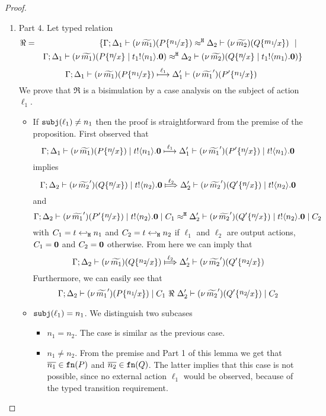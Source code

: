 \begin{proof}
\begin{enumerate}
		\item	Part 4. Let typed relation
				\begin{eqnarray*}
					\Re &=& \set{	\horel{\Gamma}{\Delta_1}{ \newsp{\widetilde{m_1}}{P \subst{n_1}{x} }}
									{\hwb}
									{\Delta_2}{ \newsp{\widetilde{m_2}}{Q \subst{m_1}{x} }} \setbar \\
						&&
									\horel{\Gamma}{\Delta_1}{ \newsp{\widetilde{m_1}}{P \subst{n}{x} \Par \bout{t_1}{n_1} \inact }}
									{\hwb}
									{\Delta_2}{ \newsp{\widetilde{m_2}}{Q \subst{n}{x} \Par \bout{t_1}{m_1} \inact }}
					}
				\end{eqnarray*}
				\[
					\horel{\Gamma}{\Delta_1}{\newsp{\widetilde{m_1}}{P \subst{n_1}{x}}}
					{\hby{\ell_1}}
					{\Delta_1'}{\newsp{\widetilde{m_1}'}{P' \subst{n_1}{x}}}
				\]
				We prove that $\Re$ is a bisimulation by a case analysis on the subject of action $\ell_1$.
				\begin{itemize}
					\item	If $\mathtt{subj}(\ell_1) \not= n_1$ then the proof is straightforward from the premise of the proposition.
							First observed that
							\[
								\horel{\Gamma}{\Delta_1}{\newsp{\widetilde{m_1}}{P \subst{n}{x}} \Par \bout{t}{n_1} \inact}
								{\hby{\ell_1}}
								{\Delta_1'}{\newsp{\widetilde{m_1}'}{P' \subst{n}{x}} \Par \bout{t}{n_1} \inact}
							\]
							implies
							\[
								\horel{\Gamma}{\Delta_2}{\newsp{\widetilde{m_2}'}{Q \subst{n}{x}} \Par \bout{t}{n_2} \inact}
								{\Hby{\ell_2}}
								{\Delta_2'}{\newsp{\widetilde{m_2}'}{Q' \subst{n}{x}} \Par \bout{t}{n_2} \inact}
							\]
							and
							\[
								\horel{\Gamma}{\Delta_2}{\newsp{\widetilde{m_1}'}{P' \subst{n}{x}} \Par \bout{t}{n_2} \inact \Par C_1}
								{\hwb}
								{\Delta_2'}{\newsp{\widetilde{m_2}'}{Q' \subst{n}{x}} \Par \bout{t}{n_2} \inact \Par C_2}
							\]
							with $C_1 = t \hookleftarrow_{\mathtt{H}} n_1$ and $C_2 = t \hookleftarrow_{\mathtt{H}} n_2$ if $\ell_1$ and $\ell_2$ are output actions,
							$C_1 = \mathbf{0}$ and $C_2 = \mathbf{0}$ otherwise.
							From here we can imply that 
							\[
								\horel{\Gamma}{\Delta_2}{\newsp{\widetilde{m_1}}{Q \subst{n_2}{x}}}
								{\Hby{\ell_2}}
								{\Delta_2'}{\newsp{\widetilde{m_2}'}{Q' \subst{n_2}{x}}}
							\]
							Furthermore, we can easily see that
							\[
								\horel{\Gamma}{\Delta_2}{\newsp{\widetilde{m_1}'}{P \subst{n_1}{x}} \Par C_1}
								{\ \Re\ }
								{\Delta_2'}{\newsp{\widetilde{m_2}'}{Q' \subst{n_2}{x}} \Par C_2}
							\]

					\item	$\mathtt{subj}(\ell_1) = n_1$. We distinguish two subcases
							\begin{itemize}
								\item	$n_1 = n_2$. The case is similar as the previous case.
								\item	$n_1 \not= n_2$.
										From the premise and Part 1 of this lemma we get
										that $\overline{n_1} \in \mathtt{fn}(P)$ and $\overline{n_2} \in \mathtt{fn}(Q)$.
										The latter implies that this case is not possible, since
										no external action $\ell_1$ would be observed, because
										of the typed transition requirement.
							\end{itemize}


\end{itemize}
\end{enumerate}
\end{proof}
